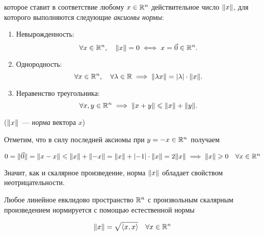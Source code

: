 \documentclass[../../main.tex]{subfiles}
\begin{document}
которое ставит в соответствие любому $x \in \mathbb{R}^n$ действительное 
число $\lVert{x}\rVert$, для которого выполняются следующие \emph{аксиомы нормы}:

\begin{enumerate}
 \item Невырожденность:
 \[\forall x \in \mathbb{R}^n, \quad \lVert{x}\rVert = 0 \iff x = \vec 0 \in \mathbb{R}^n.\]
 \item Однородность:
 \[\forall x \in \mathbb{R}^n, \quad \forall \lambda \in \mathbb{R} \implies 
   \lVert{\lambda x}\rVert = \left|{\lambda}\right| \cdot \lVert{x}\rVert.\]
 \item Неравенство треугольника:
 \[\forall x, y \in \mathbb{R}^n \implies \lVert{x+y}\rVert \leqslant \lVert{x}\rVert + \lVert{y}\rVert.\]
\end{enumerate}

($\lVert{x}\rVert$~--- \emph{норма} вектора $x$)

\bigskip

Отметим, что в силу последней аксиомы при $y = -x \in \mathbb{R}^n$ получаем

$0 = \lVert{\vec 0}\rVert = \lVert{x - x}\rVert \leqslant \lVert{x}\rVert + \lVert{-x}\rVert =
 \lVert{x}\rVert + \left|{-1}\right| \cdot \lVert{x}\rVert = 2\lVert{x}\rVert \implies \lVert{x}\rVert \geqslant 0
 \quad \forall x \in \mathbb{R}^n$
 
Значит, как и скалярное произведение, норма $\lVert{x}\rVert$ обладает
свойством неотрицательности.

\begin{thm}
 Любое линейное евклидово пространство $\mathbb{R}^n$ с произвольным скалярным
 произведением нормируется с помощью естественной нормы
 
 \begin{equation}
  \label{rn-norm}
  \lVert{x}\rVert = \sqrt{\left<x, x\right>} \quad \forall x \in \mathbb{R}^n
 \end{equation}
 
\end{thm}
\end{document}
